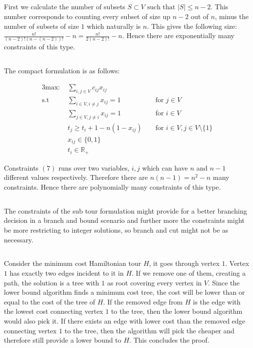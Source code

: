 \subsection{}  %
First we calculate the number of subsets $S \subset V \text{ such that } |S| \leq n - 2$. This number corresponds to counting every subset of size up $n-2$ out of $n$, minus the number of subsets of size $1$ which naturally is $n$. This gives the following size: $\frac{n!}{(n-2)! (n - (n-2))!}-n = \frac{n!}{2 (n-2)!}-n$. Hence there are exponentially many constraints of this type. 


\subsection{} %

The compact formulation is as follows:

\begin{alignat}{3}
	\text{max: }    & \sum_{i,j \in V} c_{ij} x_{ij}\\
	\text{s.t }     & \sum_{i \in V, i \neq j} x_{ij} = 1  && \text{ for } j \in V\\
	& \sum_{j \in V, j \neq i} x_{ij} = 1  && \text{ for } i \in V\\
	& t_j \geq t_i + 1-n(1-x_{ij})  && \text{ for } i \in V, j \in V \setminus \{1\}\\
	& x_{ij} \in \{0,1\} \\
	& t_i \in \mathbb{R}_+ 
\end{alignat}

Constraints $(7)$ runs over two variables, $i,j$ which can have $n$ and $n-1$ different values respectively. Therefore there are $n(n-1) = n^2-n$ many constraints. Hence there are polynomially many constraints of this type.

\subsection{} %
The constraints of the sub tour formulation might provide for a better branching decision in a branch and bound scenario and further more the constraints might be more restricting to integer solutions, so branch and cut might not be as necessary.

\subsection{} %
Consider the minimum cost Hamiltonian tour $H$, it goes through vertex $1$. Vertex $1$ has exactly two edges incident to it in $H$. If we remove one of them, creating a path, the solution is a tree with $1$ as root covering every vertex in $V$. Since the lower bound algorithm finds a minimum cost tree, the cost will be lower than or equal to the cost of the tree of $H$. If the removed edge from $H$ is the edge with the lowest cost connecting vertex $1$ to the tree, then the lower bound algorithm would also pick it. If there exists an edge with lower cost than the removed edge connecting vertex $1$ to the tree, then the algorithm will pick the cheaper and therefore still  provide a lower bound to $H$. This concludes the proof.

